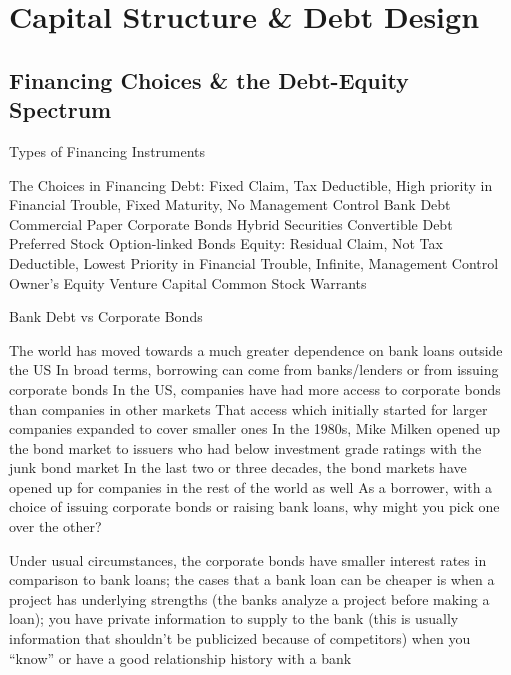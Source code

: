 \documentclass[10pt]{article}
\begin{document}
\section{Capital Structure \& Debt Design}

  \subsection{Financing Choices \& the Debt-Equity Spectrum}

    \begin{core}{Types of Financing Instruments}

      The Choices in Financing
      Debt: Fixed Claim, Tax Deductible, High priority in Financial Trouble, Fixed Maturity, No Management Control
      Bank Debt
      Commercial Paper
      Corporate Bonds 
      Hybrid Securities
      Convertible Debt
      Preferred Stock
      Option-linked Bonds
      Equity: Residual Claim, Not Tax Deductible, Lowest Priority in Financial Trouble, Infinite, Management Control
      Owner’s Equity
      Venture Capital
      Common Stock
      Warrants

    \end{core}

    \begin{core}{Bank Debt vs Corporate Bonds}

      The world has moved towards a much greater dependence on bank loans outside the US
      In broad terms, borrowing can come from banks/lenders or from issuing corporate bonds
      In the US, companies have had more access to corporate bonds than companies in other markets
      That access which initially started for larger companies expanded to cover smaller ones
      In the 1980s, Mike Milken opened up the bond market to issuers who had below investment grade ratings with the junk bond market
      In the last two or three decades, the bond markets have opened up for companies in the rest of the world as well
      As a borrower, with a choice of issuing corporate bonds or raising bank loans, why might you pick one over the other?

      Under usual circumstances, the corporate bonds have smaller interest rates in comparison to bank loans; the cases that a bank loan can be cheaper is
      when a project has underlying strengths (the banks analyze a project before making a loan); you have private information to supply to the bank (this is usually information that shouldn’t be publicized because of competitors)
      when you “know” or have a good relationship history with a bank

    \end{core}
\end{document}
